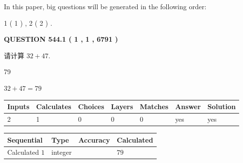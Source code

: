\documentclass{ctexart}
\begin{document}
In this paper, big questions will be generated in the following order: 
   
   
   1 ( 1 )
 ,
   2 ( 2 )
 .
  
\vspace{0.2in}
  
{\textbf{\Large{QUESTION
544.1 
 ( 1 , 1 , 6791 )
}}}
  
  
 
请计算 $ %
32 +  %
47 $.
 
 
 
\noindent{}
 
 

79
 
 
\noindent{}
 
 

 
 
 
\noindent{}
 
 

$ %
32 +  %
47=   %
79$
 
 
\noindent{}
 
 

 
   
   
   
   
\noindent\begin{tabular}{|l|l|l|l|l|l|l|}
 \hline
Inputs & Calculates & Choices & Layers & Matches & Answer & Solution \\ \hline
 2  & 
 1  & 
 0
  & 
 0  & 
 0  & 
  yes & 
  yes 
  \\ \hline
 \end{tabular}
   
   
   
   
\noindent{}
   
   
  
  
\noindent\begin{tabular}{|l|l|l|l|}
\hline
 Sequential & Type & Accuracy & Calculated \\ 
\hline
 
 
  Calculated $  1 $ & integer &  & 
  $ 79 $ 
 \\  \hline  
 \end{tabular}
   
\end{document}
